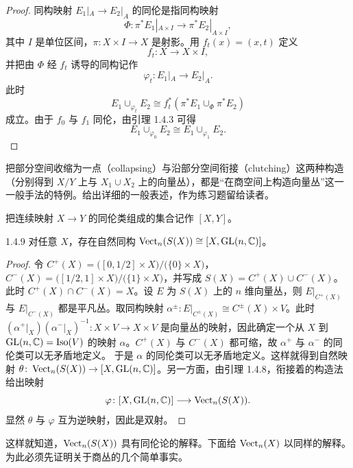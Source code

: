 \begin{proof}
  同构映射 $E_1|_A\to E_2|_A$ 的同伦是指同构映射
\[
\Phi\colon\pi^*E_1|_{A\times I}\to\pi^*E_2|_{A\times I},
\]
其中 $I$ 是单位区间，$\pi\colon X\times I\to X$ 是射影。用 $f_t(x)=(x,t)$ 定义
\[
f_t\colon X\to X\times I,
\]
并把由 $\Phi$ 经 $f_t$ 诱导的同构记作
\[
\varphi_t\colon E_1|_A\to E_2|_A.
\]
此时
\[
E_1\cup_{\varphi_t}E_2\cong f_t^*(\pi^*E_1\cup_\Phi\pi^*E_2)
\]
成立。由于 $f_0$ 与 $f_1$ 同伦，由引理 1.4.3 可得
\[
E_1\cup_{\varphi_0}E_2\cong E_1\cup_{\varphi_1}E_2.
\]
\end{proof}


\begin{remark}{}
  把部分空间收缩为一点（collapsing）与沿部分空间衔接（clutching）这两种构造（分别得到 $X/Y$ 上与 $X_1\cup X_2$ 上的向量丛），都是“在商空间上构造向量丛”这一一般手法的特例。给出详细的一般表述，作为练习题留给读者。
\end{remark}

把连续映射 $X\to Y$ 的同伦类组成的集合记作 $[X,Y]$。

\begin{lemma*}{1.4.9}
  对任意 $X$，存在自然同构 $\operatorname{Vect}_n(S(X))\cong[X,\mathrm{GL}(n,\mathbb{C})]$。
\end{lemma*}

\begin{proof}
  令 $C^+(X)=\bigl([0,1/2]\times X\bigr)/\bigl(\{0\}\times X\bigr)$，$C^-(X)=\bigl([1/2,1]\times X\bigr)/\bigl(\{1\}\times X\bigr)$，并写成 $S(X)=C^+(X)\cup C^-(X)$。此时 $C^+(X)\cap C^-(X)=X$。设 $E$ 为 $S(X)$ 上的 $n$ 维向量丛，则 $E|_{C^+(X)}$ 与 $E|_{C^-(X)}$ 都是平凡丛。取同构映射 $\alpha^{\pm}\colon E|_{C^\pm(X)}\cong C^\pm(X)\times V$。此时 $(\alpha^+|_X)(\alpha^-|_X)^{-1}\colon X\times V\to X\times V$ 是向量丛的映射，因此确定一个从 $X$ 到 $\mathrm{GL}(n,\mathbb{C})=\operatorname{Iso}(V)$ 的映射 $\alpha$。$C^+(X)$ 与 $C^-(X)$ 都可缩，故 $\alpha^+$ 与 $\alpha^-$ 的同伦类可以无矛盾地定义。
  于是 $\alpha$ 的同伦类可以无矛盾地定义。这样就得到自然映射 $\theta\colon\operatorname{Vect}_n(S(X))\to[X,\mathrm{GL}(n,\mathbb{C})]$。另一方面，由引理 1.4.8，衔接着的构造法给出映射
\[
\varphi\colon[X,\mathrm{GL}(n,\mathbb{C})]\longrightarrow\operatorname{Vect}_n(S(X)).
\]
显然 $\theta$ 与 $\varphi$ 互为逆映射，因此是双射。
\end{proof}

这样就知道，$\operatorname{Vect}_n(S(X))$ 具有同伦论的解释。下面给 $\operatorname{Vect}_n(X)$ 以同样的解释。为此必须先证明关于商丛的几个简单事实。


